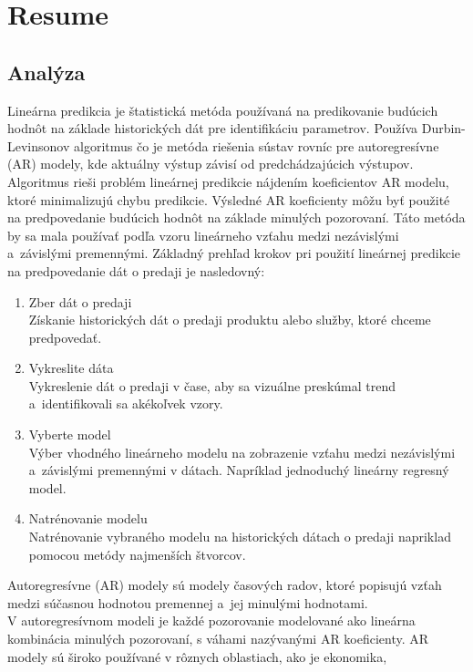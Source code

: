 \chapter{Resume} \label{resume}
    \section{Analýza} \label{sk:analytic}
    Lineárna predikcia je štatistická metóda používaná na predikovanie budúcich hodnôt na základe historických dát pre
    identifikáciu parametrov. Používa Durbin-Levinsonov algoritmus čo je metóda riešenia sústav rovníc pre
    autoregresívne (AR) modely, kde aktuálny výstup závisí od predchádzajúcich výstupov. Algoritmus
    rieši problém lineárnej predikcie nájdením koeficientov AR modelu, ktoré minimalizujú chybu predikcie. Výsledné AR
    koeficienty môžu byť použité na predpovedanie budúcich hodnôt na základe minulých pozorovaní. Táto metóda by sa mala
    používať podľa vzoru lineárneho vzťahu medzi nezávislými a~závislými premennými. Základný prehľad krokov
    pri použití lineárnej predikcie na predpovedanie dát o predaji je nasledovný:\\
    \begin{enumerate}
        \item Zber dát o predaji\\
        Získanie historických dát o predaji produktu alebo služby, ktoré chceme predpovedať.
        \item Vykreslite dáta\\
        Vykreslenie dát o predaji v čase, aby sa vizuálne preskúmal trend\\a~identifikovali sa akékoľvek vzory.
        \item Vyberte model\\
        Výber vhodného lineárneho modelu na zobrazenie vzťahu medzi nezávislými a~závislými
        premennými v dátach. Napríklad jednoduchý lineárny regresný model.
        \item Natrénovanie modelu\\
        Natrénovanie vybraného modelu na historických dátach o predaji napriklad pomocou metódy najmenších štvorcov.
    \end{enumerate}
    Autoregresívne (AR) modely sú modely časových radov, ktoré popisujú vzťah medzi súčasnou hodnotou premennej a~jej
    minulými hodnotami.\\V autoregresívnom modeli je každé pozorovanie modelované ako lineárna kombinácia minulých
    pozorovaní, s váhami nazývanými AR koeficienty. AR modely sú široko používané v rôznych oblastiach, ako je ekonomika,
